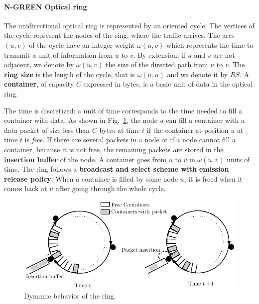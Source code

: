 \documentclass[10pt, conference, letterpaper]{IEEEtran}
\begin{document}
  \paragraph{N-GREEN Optical ring}
   
  The unidirectional optical ring is represented by an oriented cycle. The vertices of the cycle represent the nodes of the ring, where the traffic arrives. The arcs $(u,v)$ of the cycle have an integer weight $\omega(u,v)$ which represents the time to transmit a unit of information from $u$ to $v$. By extension, if $u$ and $v$ are not adjacent, we denote by $\omega(u,v)$ the size of the directed path from $u$ to $v$.  The \textbf{ring size} is the length of the cycle, that is $\omega(u,u)$ and we denote it by $RS$. A {\bf container}, of capacity $C$  expressed in bytes, is a basic unit of data in the optical ring. 
  
  The time is discretized: a unit of time corresponds to the time needed to fill a container with data.
  As shown in Fig.~\ref{fig:containers}, the node $u$ can fill a container with a data packet of size less than $C$ bytes at time $t$ if the container at position $u$ at time $t$ is \emph{free}. 
  If there are several packets in a node or if a node cannot fill a container, because it is not free, 
  the remaining packets are stored in the {\bf insertion buffer} of the node. 
  A container goes from $u$ to $v$ in $\omega(u,v)$ units of time. The ring follows a {\bf broadcast and select scheme with emission release policy}: When a container is filled by some node $u$, it is freed when it comes back at $u$ after going through the whole cycle.
   
  
  \begin{figure}[h!]

        \begin{center}
   \includegraphics[scale=0.65]{containers}
   
   
      \end{center} 

   
     \caption{Dynamic behavior of the ring.}\label{fig:containers}

  \end{figure}
  
\end{document}
